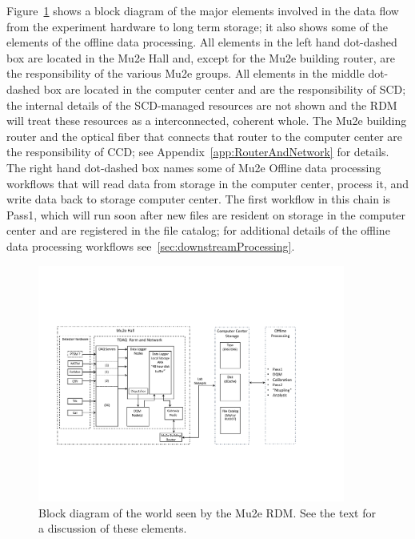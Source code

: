 Figure~\ref{fig:blockdiagram} shows a block diagram of the major elements involved
in the data flow from the experiment hardware to long term storage; it also shows
some of the elements of the offline data processing.
All elements in the left hand dot-dashed box are located in the Mu2e Hall
and, except for the Mu2e building router, are the responsibility of the various Mu2e groups.
All elements in the middle dot-dashed box are located in the computer center
and are the responsibility of SCD; the internal details of the SCD-managed resources
are not shown and the RDM will treat these resources as a interconnected, coherent whole.
The Mu2e building router and the optical fiber that connects that router
to the computer center are the responsibility of CCD;
see Appendix~\ref{app:RouterAndNetwork} for details.
The right hand dot-dashed box names some of Mu2e Offline data processing workflows
that will read data from storage in the computer center, process it,
and write data back to storage computer center.
The first workflow in this chain is Pass1, which will run soon after new files
are resident on storage in the computer center and are registered in the file catalog;
for additional details of the offline data processing workflows see~\ref{sec:downstreamProcessing}.

\begin{figure}[tbp]
\centering
\includegraphics[width=0.9\textwidth]{figures/interface_with_TDAQ.pdf}
\caption[Block diagram of interfaces seen by the Mu2e RDM]{
  Block diagram of the world seen by the Mu2e RDM.
  See the text for a discussion of these elements.}
\label{fig:blockdiagram}
\end{figure}

